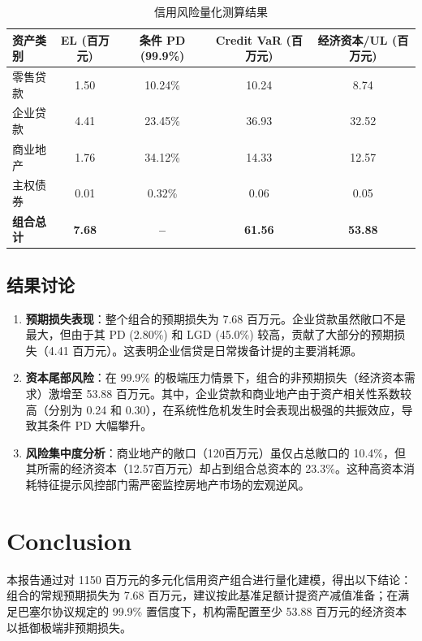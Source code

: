 \documentclass[12pt]{article}
\begin{document}
\begin{table}[H]
\centering
\caption{信用风险量化测算结果}
\label{tab:results}
\vspace{0.2cm}
\begin{tabular}{lcccc}
\toprule
\textbf{资产类别} & \textbf{EL (百万元)} & \textbf{条件 PD (99.9\%)} & \textbf{Credit VaR (百万元)} & \textbf{经济资本/UL (百万元)} \\
\midrule
零售贷款   & 1.50  & 10.24\% & 10.24 & 8.74  \\
企业贷款   & 4.41  & 23.45\% & 36.93 & 32.52 \\
商业地产   & 1.76  & 34.12\% & 14.33 & 12.57 \\
主权债券   & 0.01  & 0.32\%  & 0.06  & 0.05  \\
\midrule
\textbf{组合总计} & \textbf{7.68} & \textbf{--} & \textbf{61.56} & \textbf{53.88} \\
\bottomrule
\end{tabular}
\end{table}

\subsection{结果讨论}
\begin{enumerate}
    \item \textbf{预期损失表现}：整个组合的预期损失为 7.68 百万元。企业贷款虽然敞口不是最大，但由于其 PD (2.80\%) 和 LGD (45.0\%) 较高，贡献了大部分的预期损失（4.41 百万元）。这表明企业信贷是日常拨备计提的主要消耗源。
    \item \textbf{资本尾部风险}：在 99.9\% 的极端压力情景下，组合的非预期损失（经济资本需求）激增至 53.88 百万元。其中，企业贷款和商业地产由于资产相关性系数较高（分别为 0.24 和 0.30），在系统性危机发生时会表现出极强的共振效应，导致其条件 PD 大幅攀升。
    \item \textbf{风险集中度分析}：商业地产的敞口（120百万元）虽仅占总敞口的 10.4\%，但其所需的经济资本（12.57百万元）却占到组合总资本的 23.3\%。这种高资本消耗特征提示风控部门需严密监控房地产市场的宏观逆风。
\end{enumerate}


\section{Conclusion}
本报告通过对 1150 百万元的多元化信用资产组合进行量化建模，得出以下结论：
组合的常规预期损失为 7.68 百万元，建议按此基准足额计提资产减值准备；在满足巴塞尔协议规定的 99.9\% 置信度下，机构需配置至少 53.88 百万元的经济资本以抵御极端非预期损失。
\end{document}
